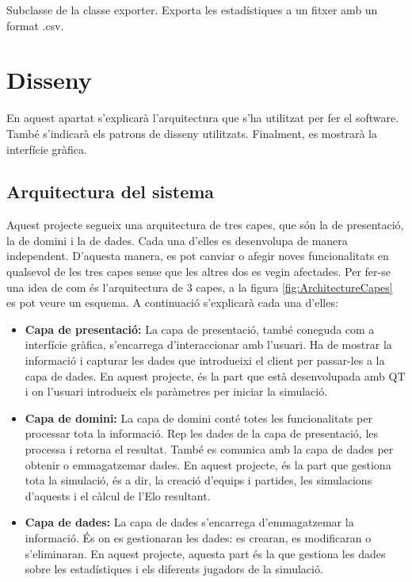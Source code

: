 \documentclass[a4paper]{article}
\begin{document}
Subclasse de la classe exporter. Exporta les estadístiques a un fitxer amb un format .csv.



\newpage
\section{Disseny}

En aquest apartat s'explicarà l'arquitectura que s'ha utilitzat per fer el software. També s'indicarà els patrons de disseny utilitzats. Finalment, es mostrarà la interfície gràfica.

\subsection{Arquitectura del sistema}
Aquest projecte segueix una arquitectura de tres capes, que són la de presentació, la de domini i la de dades. Cada una d'elles es desenvolupa de manera independent. D'aquesta manera, es pot canviar o afegir noves funcionalitats en qualsevol de les tres capes sense que les altres dos es vegin afectades. Per fer-se una idea de com és l'arquitectura de 3 capes, a la figura \ref{fig:ArchitectureCapes} es pot veure un esquema. A continuació s'explicarà cada una d'elles:

\begin{itemize}
    \item \textbf{Capa de presentació:} La capa de presentació, també coneguda com a interfície gràfica, s'encarrega d'interaccionar amb l'usuari. Ha de mostrar la informació i capturar les dades que introdueixi el client per passar-les a la capa de dades. En aquest projecte, és la part que està desenvolupada amb QT i on l'usuari introdueix els paràmetres per iniciar la simulació.
    
    \item \textbf{Capa de domini:} La capa de domini conté totes les funcionalitats per processar tota la informació. Rep les dades de la capa de presentació, les processa i retorna el resultat. També es comunica amb la capa de dades per obtenir o emmagatzemar dades. En aquest projecte, és la part que gestiona tota la simulació, és a dir, la creació d'equips i partides, les simulacions d'aquests i el càlcul de l'Elo resultant.
    
    \item \textbf{Capa de dades:} La capa de dades s'encarrega d'emmagatzemar la informació. És on es gestionaran les dades: es crearan, es modificaran o s'eliminaran. En aquest projecte, aquesta part és la que gestiona les dades sobre les estadístiques i els diferents jugadors de la simulació.
\end{itemize}
\end{document}
